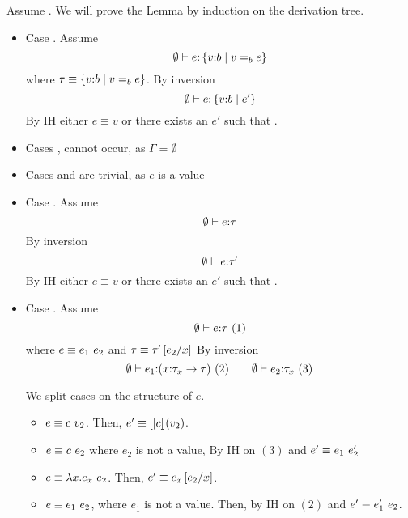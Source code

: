 Assume .
We will prove the Lemma by induction on the derivation tree.
\begin{itemize}
\item Case \rtexact. Assume
$$	\hastype{\emptyset}{e}{\tref{v}{b}{v \eqb{b} e}}
$$
where $\tau\equiv\tref{v}{b}{v\eqb{b} e}$.
By inversion
$$	\hastype{\emptyset}{e}{\tref{v}{b}{e'}}$$
By IH 
either $e \equiv v$ or there exists an $e'$ such that .

\item Cases \rtvarbase, \rtvar cannot occur, as $\Gamma = \emptyset$
\item Cases \rtconst and \rtfun are trivial, 
		as $e$ is a value
\item Case \rtsub. Assume 
$$\hastype{\emptyset}{e}{\tau}$$
By inversion
$$	\hastype{\emptyset}{e}{\tau'}$$
By IH 
either $e \equiv v$ or there exists an $e'$ such that .
\item Case \rtapp. Assume 
$$\hastype{\emptyset}{e}{\tau}\ (1)$$
where $e\equiv\eapp{e_1}{e_2}$ and $\tau\equiv\tau'\sub{x}{e_2}$
By inversion
$$
	\hastype{\emptyset}{e_1}{(\tfun{x}{\tau_{x}}{\tau})}\ (2)\qquad
	\hastype{\emptyset}{e_2}{\tau_{x}}\ (3)
$$

We split cases on the structure of $e$.
\begin{itemize}
\item $e\equiv \eapp{c}{v_2}$.
Then, $e'\equiv\interp{c}(v_2)$.

\item $e\equiv \eapp{c}{e_2}$ where $e_2$ is not a value, 
By IH on $(3)$  and  $e' \equiv \eapp{e_1}{e_2'}$

\item $e \equiv \eapp{\efun{x}{e_x}}{e_2}$.
Then, $e' \equiv e_x\sub{x}{e_2}$.

\item $e \equiv \eapp{e_1}{e_2}$, where $e_1$ is not a value.
Then, by IH on $(2)$  and 
$e'\equiv\eapp{e_1'}{e_2}$.
\end{itemize}
\end{itemize}